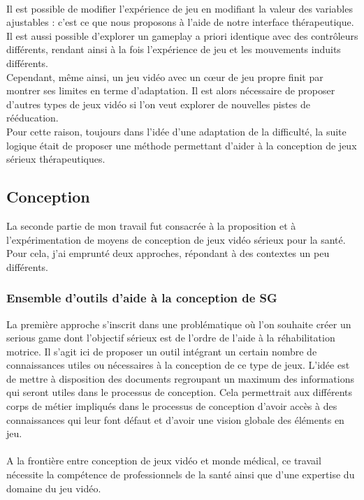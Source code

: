 \paragraph{}
Il est possible de modifier l'expérience de jeu en modifiant la valeur des variables ajustables : c'est ce que nous proposons à l'aide de notre interface thérapeutique. Il est aussi possible d'explorer un gameplay a priori identique avec des contrôleurs différents, rendant ainsi à la fois l'expérience de jeu et les mouvements induits différents.
\\Cependant, même ainsi, un jeu vidéo avec un cœur de jeu propre finit par montrer ses limites en terme d'adaptation. Il est alors nécessaire de proposer d'autres types de jeux vidéo si l'on veut explorer de nouvelles pistes de rééducation.\\
Pour cette raison, toujours dans l'idée d'une adaptation de la difficulté, la suite logique était de proposer une méthode permettant d'aider à la conception de jeux sérieux thérapeutiques.
 
\subsection{Conception}
	La seconde partie de mon travail fut consacrée à la proposition et à l'expérimentation de moyens de conception de jeux vidéo sérieux pour la santé. Pour cela, j'ai emprunté deux approches, répondant à des contextes un peu différents.
	
	\subsubsection{Ensemble d'outils d'aide à la conception de SG}
	La première approche s'inscrit dans une problématique où l'on souhaite créer un serious game dont l'objectif sérieux est de l'ordre de l'aide à la réhabilitation motrice. Il s'agit ici de proposer un outil intégrant un certain nombre de connaissances utiles ou nécessaires à la conception de ce type de jeux. L'idée est de mettre à disposition des documents regroupant un maximum des informations qui seront utiles dans le processus de conception. Cela permettrait aux différents corps de métier impliqués dans le processus de conception d'avoir accès à des connaissances qui leur font défaut et d'avoir une vision globale des éléments en jeu.
	
		\paragraph{}
A la frontière entre conception de jeux vidéo et monde médical, ce travail nécessite la compétence de professionnels de la santé ainsi que d’une expertise du domaine du jeu vidéo.
